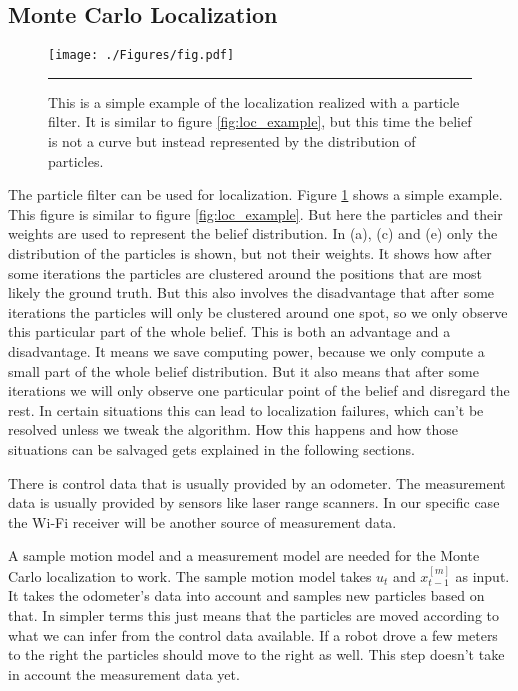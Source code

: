 \subsection{Monte Carlo Localization}
\begin{figure}[htbp]
	\centering
		\texttt{[image: ./Figures/fig.pdf]}
		\rule{35em}{0.5pt}
	\caption[Simple example of localization with particle filter]{This is a simple example of the localization realized with a particle filter. It is similar to figure \ref{fig:loc_example}, but this time the belief is not a curve but instead represented by the distribution of particles. \cite[p. 251]{Thrun:2005:PR:1121596}}
	\label{fig:particle_localization}
\end{figure}
The particle filter can be used for localization.\cite[p. 252]{Thrun:2005:PR:1121596} Figure \ref{fig:particle_localization} shows a simple example. This figure is similar to figure \ref{fig:loc_example}. But here the particles and their weights are used to represent the belief distribution. In (a), (c) and (e) only the distribution of the particles is shown, but not their weights. It shows how after some iterations the particles are clustered around the positions that are most likely the ground truth. But this also involves the disadvantage that after some iterations the particles will only be clustered around one spot, so we only observe this particular part of the whole belief. This is both an advantage and a disadvantage. It means we save computing power, because we only compute a small part of the whole belief distribution. But it also means that after some iterations we will only observe one particular point of the belief and disregard the rest. In certain situations this can lead to localization failures, which can't be resolved unless we tweak the algorithm. How this happens and how those situations can be salvaged gets explained in the following sections. 

There is control data that is usually provided by an odometer. The measurement data is usually provided by sensors like laser range scanners. In our specific case the Wi-Fi receiver will be another source of measurement data. 

A sample motion model and a measurement model are needed for the Monte Carlo localization to work. The sample motion model takes $u_t$ and $x_{t-1}^{[m]}$ as input. It takes the odometer's data into account and samples new particles based on that. In simpler terms this just means that the particles are moved according to what we can infer from the control data available. If a robot drove a few meters to the right the particles should move to the right as well. This step doesn't take in account the measurement data yet.

